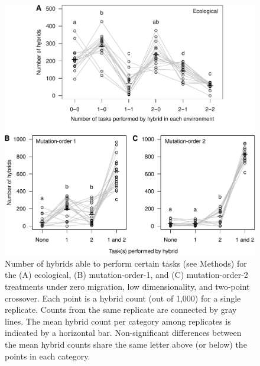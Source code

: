 \begin{doublespace}
\begin{figure}
\centering
\includegraphics[width=\linewidth]{hybrid_counts.pdf}
\caption{Number of hybrids able to perform certain tasks (see Methods) for
  the (A) ecological, (B) mutation-order-1, and (C) mutation-order-2 treatments
  under zero migration, low dimensionality, and two-point crossover.
  Each point is a hybrid count (out of 1,000) for a single replicate.
  Counts from the same replicate are connected by gray lines.
  The mean hybrid count per category among replicates
  is indicated by a horizontal bar.
  Non-significant differences between the mean hybrid counts
  share the same letter above (or below) the points in each category.}
\label{hybrid_counts}
\end{figure}




\end{doublespace}
